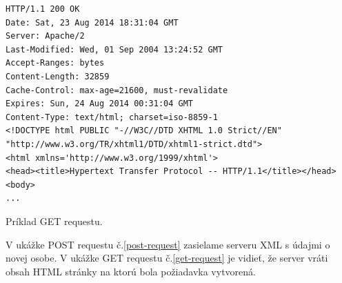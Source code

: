 \begin{algorithm}[H]
\begin{lstlisting}
HTTP/1.1 200 OK
Date: Sat, 23 Aug 2014 18:31:04 GMT
Server: Apache/2
Last-Modified: Wed, 01 Sep 2004 13:24:52 GMT
Accept-Ranges: bytes
Content-Length: 32859
Cache-Control: max-age=21600, must-revalidate
Expires: Sun, 24 Aug 2014 00:31:04 GMT
Content-Type: text/html; charset=iso-8859-1
<!DOCTYPE html PUBLIC "-//W3C//DTD XHTML 1.0 Strict//EN" "http://www.w3.org/TR/xhtml1/DTD/xhtml1-strict.dtd">
<html xmlns='http://www.w3.org/1999/xhtml'>
<head><title>Hypertext Transfer Protocol -- HTTP/1.1</title></head>
<body>
...
\end{lstlisting}
 \caption{Príklad GET requestu.}
 \label{get-request}
\end{algorithm}

V ukážke POST requestu č.\ref{post-request} zasielame serveru XML s údajmi o novej osobe. V ukážke GET requestu č.\ref{get-request} je vidieť, že server vráti obsah HTML stránky na ktorú bola požiadavka vytvorená.

